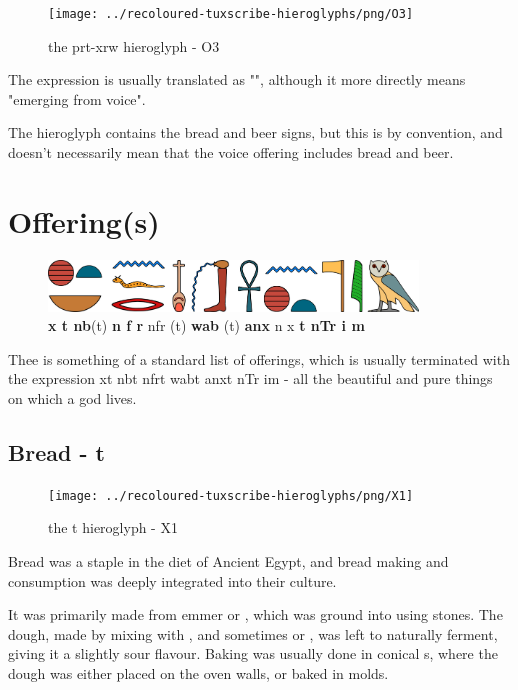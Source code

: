 \begin{figure} [H]
	\centering
	\texttt{[image: ../recoloured-tuxscribe-hieroglyphs/png/O3]}
	\caption{the prt-xrw hieroglyph - O3}
\end{figure}

The expression  is usually translated as "", although it more directly means "emerging from voice".

The hieroglyph contains the bread and beer signs, but this is by convention, and doesn't necessarily mean that the voice offering includes bread and beer.

\section*{Offering(s)}

\begin{figure} [H]
	\centering
	\includegraphics[width=0.875\textwidth]{../images/xt-nb-nfr-wab-anxt-ntr-im}
	\caption{\textbf{x t nb}(t) \textbf{n f r} nfr (t) \textbf{wab} (t) \textbf{anx} n x \textbf{t nTr i m}}
\end{figure}

Thee is something of a standard list of offerings, which is usually terminated with the expression xt nbt nfrt wabt anxt nTr im - all the beautiful and pure things on which a god lives.

\subsection*{Bread - t}

\begin{figure} [H]
	\centering
	\texttt{[image: ../recoloured-tuxscribe-hieroglyphs/png/X1]}
	\caption{the t hieroglyph - X1}
\end{figure}

Bread was a staple in the diet of Ancient Egypt, and bread making and consumption was deeply integrated into their culture.

It was primarily made from emmer  or , which was ground into  using stones. The dough, made by mixing with , and sometimes  or , was left to naturally ferment, giving it a slightly sour flavour. Baking was usually done in conical  s, where the dough was either placed on the oven walls, or baked in molds.

